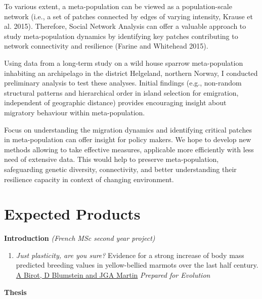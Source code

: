\documentclass[
  12pt,
  letterpaper,
]{scrartcl}
\providecommand{\tightlist}{%
  \setlength{\itemsep}{0pt}\setlength{\parskip}{0pt}}
\begin{document}
To various extent, a meta-population can be viewed as a population-scale
network (i.e., a set of patches connected by edges of varying intensity,
Krause et al. 2015). Therefore, Social Network Analysis can offer a
valuable approach to study meta-population dynamics by identifying key
patches contributing to network connectivity and resilience (Farine and
Whitehead 2015).

Using data from a long-term study on a wild house sparrow
meta-population inhabiting an archipelago in the district Helgeland,
northern Norway, I conducted preliminary analysis to test these
analyses. Initial findings (e.g., non-random structural patterns and
hierarchical order in island selection for emigration, independent of
geographic distance) provides encouraging insight about migratory
behaviour within meta-population.

Focus on understanding the migration dynamics and identifying critical
patches in meta-population can offer insight for policy makers. We hope
to develop new methods allowing to take effective measures, applicable
more efficiently with less need of extensive data. This would help to
preserve meta-population, safeguarding genetic diversity, connectivity,
and better understanding their resilience capacity in context of
changing environment.

\newpage{}

\section{Expected Products}\label{expected-products}

\textbf{Introduction} \emph{(French MSc second year project)}

\begin{enumerate}
\def\labelenumi{\arabic{enumi}.}
\tightlist
\item
  \emph{Just plasticity, are you sure?} Evidence for a strong increase
  of body mass predicted breeding values in yellow-bellied marmots over
  the last half century. \ul{A Birot, D Blumstein and JGA Martin}
  \emph{Prepared for Evolution}
\end{enumerate}

\textbf{Thesis}
\end{document}
